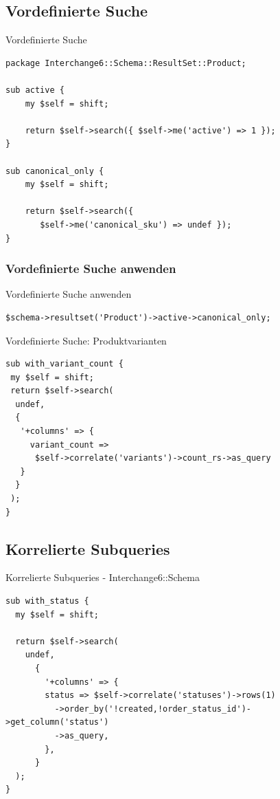 \subsection{Vordefinierte Suche}

\begin{frame}[fragile]{Vordefinierte Suche}
\begin{lstlisting}
package Interchange6::Schema::ResultSet::Product;

sub active {
    my $self = shift;

    return $self->search({ $self->me('active') => 1 });
}

sub canonical_only {
    my $self = shift;

    return $self->search({ 
       $self->me('canonical_sku') => undef });
}

\end{lstlisting}
\end{frame}

\subsubsection{Vordefinierte Suche anwenden}

\begin{frame}[fragile]{Vordefinierte Suche anwenden}
\begin{lstlisting}
$schema->resultset('Product')->active->canonical_only;
\end{lstlisting}
\end{frame}

\begin{frame}[fragile]{Vordefinierte Suche: Produktvarianten}
\begin{lstlisting}
sub with_variant_count {
 my $self = shift;
 return $self->search(
  undef,
  {
   '+columns' => {
     variant_count =>
      $self->correlate('variants')->count_rs->as_query
   }
  }
 );
}
\end{lstlisting}
\end{frame}

\subsection{Korrelierte Subqueries}

\begin{frame}[fragile]{Korrelierte Subqueries - Interchange6::Schema}
  \begin{lstlisting} 
sub with_status {
  my $self = shift;

  return $self->search(
    undef,
      {
        '+columns' => {
        status => $self->correlate('statuses')->rows(1)
          ->order_by('!created,!order_status_id')->get_column('status')
          ->as_query,
        },
      }
  );
}
\end{lstlisting}
\end{frame}

